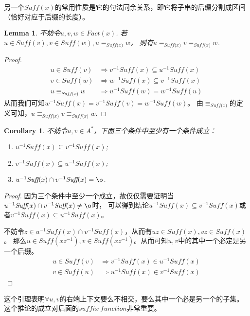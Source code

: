 \documentclass[UTF8]{ctexart}
\newtheorem{cor}[thm]{Corollary}
\newtheorem{lem}[thm]{Lemma}
\theoremstyle{definition}
\theoremstyle{remark}
\numberwithin{equation}{subsection}
\newcommand{\equsuf}[1][x]{\equiv_{\textit{Suff(#1)}}}
\newcommand{\Suff}{\textit{Suff}}
\begin{document}
	另一个$\Suff(x)$的常用性质是它的句法同余关系，即它将子串的后缀分割成区间（恰好对应于后缀的长度）。
	
	\begin{lem}
	\label{lem:suf_congruence}
		不妨令$u,v,w \in Fact(x)$. 若$u \in \Suff(v), v \in \Suff(w), u \equsuf w$，
		则有$u \equsuf v \equsuf w$.
	\end{lem}
	\begin{proof}
		\begin{align*}
			u \in \Suff(v)		&\Rightarrow 	v^{-1} \Suff(x) \subseteq u^{-1} \Suff(x)	\\
			v \in \Suff(w)		&\Rightarrow	w^{-1} \Suff(x) \subseteq v^{-1} \Suff(x)	\\
			u \equsuf w			&\Rightarrow	u^{-1} \Suff(w) = w^{-1} \Suff(u)
		\end{align*}
		从而我们可知$w^{-1} \Suff(x) = v^{-1} \Suff(v) = w^{-1} \Suff(w)$。
		由$\equsuf$的定义可知，$u \equsuf v \equsuf w$.
	\end{proof}
	
	\begin{cor}	
	\label{cor:3_cond}
		不妨令$u,v \in A^*$，下面三个条件中至少有一个条件成立：
		\begin{enumerate}[(1)]
			\item $u^{-1} \Suff(x) \subseteq v^{-1} \Suff(x)$;
			
			\item $v^{-1} \Suff(x) \subseteq u^{-1} \Suff(x)$;
			
			\item $u^{-1} \Suff(x) \cap v^{-1} \Suff(x) = {\o}$.
		\end{enumerate}
	\end{cor}
	\begin{proof}
		因为三个条件中至少一个成立，故仅仅需要证明当$u^{-1} \Suff(x) \cap v^{-1} \Suff(x) \neq {\o}$时，
		可以得到结论$u^{-1} \Suff(x) \subseteq v^{-1} \Suff(x)$或者$v^{-1} \Suff(x) \subseteq u^{-1} \Suff(x)$。
		
		不妨令$z \in u^{-1} \Suff(x) \cap v^{-1} \Suff(x)$，从而有$uz \in \Suff(x), vz \in \Suff(x)$。
		那么$u \in \Suff(xz^{-1}), v \in \Suff(xz^{-1})$。从而可知$u,v$中的其中一个必定是另一个后缀。
		\begin{align*}	
			u \in \Suff(v)	&\Rightarrow v^{-1} \Suff(x) \in u^{-1} \Suff(x)	\\
			v \in \Suff(u)	&\Rightarrow u^{-1} \Suff(x) \in v^{-1} \Suff(x)
		\end{align*}
	\end{proof}
	这个引理表明$\forall u,v$的右端上下文要么不相交，要么其中一个必是另一个的子集。
	这个推论的成立对后面的$suffix\ function$非常重要。
	
\end{document}
